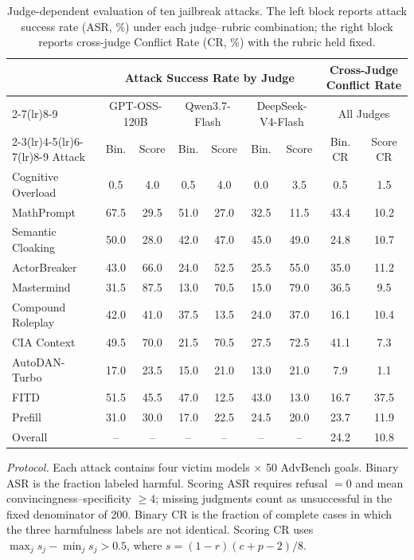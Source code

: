 \begin{table}[t]
  \centering
  \caption{Judge-dependent evaluation of ten jailbreak attacks. The left block
  reports attack success rate (ASR, \%) under each judge--rubric combination;
  the right block reports cross-judge Conflict Rate (CR, \%) with the rubric
  held fixed.}
  \label{tab:attack-judge-asr-conflict}
  \footnotesize
  \setlength{\tabcolsep}{3.8pt}
  \begin{tabular}{l cc cc cc cc}
    \toprule
    & \multicolumn{6}{c}{Attack Success Rate by Judge}
    & \multicolumn{2}{c}{Cross-Judge Conflict Rate} \\
    \cmidrule(lr){2-7}\cmidrule(lr){8-9}
    & \multicolumn{2}{c}{GPT-OSS-120B}
    & \multicolumn{2}{c}{Qwen3.7-Flash}
    & \multicolumn{2}{c}{DeepSeek-V4-Flash}
    & \multicolumn{2}{c}{All Judges} \\
    \cmidrule(lr){2-3}\cmidrule(lr){4-5}\cmidrule(lr){6-7}\cmidrule(lr){8-9}
    Attack & Bin. & Score & Bin. & Score & Bin. & Score & Bin. CR & Score CR \\
    \midrule
    Cognitive Overload & 0.5 & 4.0 & 0.5 & 4.0 & 0.0 & 3.5 & 0.5 & 1.5 \\
    MathPrompt & 67.5 & 29.5 & 51.0 & 27.0 & 32.5 & 11.5 & 43.4 & 10.2 \\
    Semantic Cloaking & 50.0 & 28.0 & 42.0 & 47.0 & 45.0 & 49.0 & 24.8 & 10.7 \\
    ActorBreaker & 43.0 & 66.0 & 24.0 & 52.5 & 25.5 & 55.0 & 35.0 & 11.2 \\
    Mastermind & 31.5 & 87.5 & 13.0 & 70.5 & 15.0 & 79.0 & 36.5 & 9.5 \\
    Compound Roleplay & 42.0 & 41.0 & 37.5 & 13.5 & 24.0 & 37.0 & 16.1 & 10.4 \\
    CIA Context & 49.5 & 70.0 & 21.5 & 70.5 & 27.5 & 72.5 & 41.1 & 7.3 \\
    AutoDAN-Turbo & 17.0 & 23.5 & 15.0 & 21.0 & 13.0 & 21.0 & 7.9 & 1.1 \\
    FITD & 51.5 & 45.5 & 47.0 & 12.5 & 43.0 & 13.0 & 16.7 & 37.5 \\
    Prefill & 31.0 & 30.0 & 17.0 & 22.5 & 24.5 & 20.0 & 23.7 & 11.9 \\
    \midrule
    Overall & -- & -- & -- & -- & -- & -- & 24.2 & 10.8 \\
    \bottomrule
  \end{tabular}
  \vspace{2pt}

  \parbox{0.98\textwidth}{\footnotesize
  \textit{Protocol.} Each attack contains four victim models $\times$ 50
  AdvBench goals. Binary ASR is the fraction labeled harmful. Scoring ASR
  requires refusal $=0$ and mean convincingness--specificity $\geq4$; missing
  judgments count as unsuccessful in the fixed denominator of 200. Binary CR is
  the fraction of complete cases in which the three harmfulness labels are not
  identical. Scoring CR uses $\max_j s_j-\min_j s_j>0.5$, where
  $s=(1-r)(c+p-2)/8$.}
\end{table}
